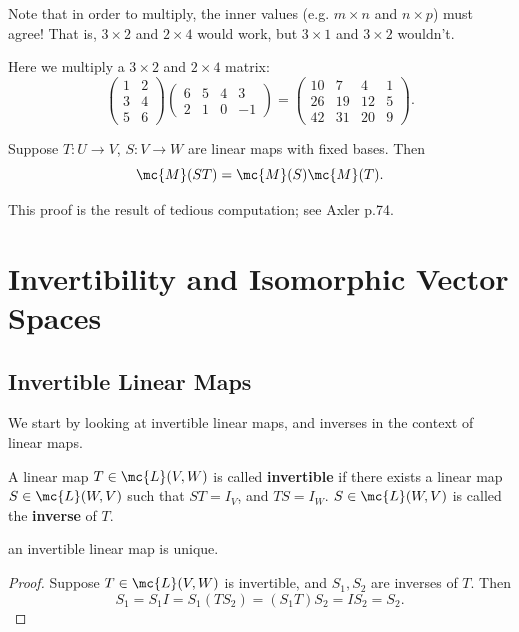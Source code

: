 \documentclass[math0540-lecture-notes.tex]{subfiles}
\begin{document}
Note that in order to multiply, the inner values (e.g. $m\times n$ and $n\times p$) must agree! That
is, $3\times 2$ and $2\times 4$ would work, but $3\times 1$ and $3\times 2$ wouldn't.
\begin{example}
  Here we multiply a $3\times 2$ and $2\times 4$ matrix: \[
    \begin{pmatrix} 1&2\\3&4\\5&6 \end{pmatrix} \begin{pmatrix} 6&5&4&3 \\2&1&0&-1\end{pmatrix}
    =\begin{pmatrix} 10&7&4&1\\26&19&12&5\\42&31&20&9 \end{pmatrix}
  .\] 
\end{example} 

\begin{proposition}[]{}
  Suppose $T:U\to V$, $S:V\to W$ are linear maps with fixed bases. Then \[
    \mc{M}(ST)=\mc{M}(S)\mc{M}(T)
  .\] 
\end{proposition}
This proof is the result of tedious computation; see Axler p.74.


\section{Invertibility and Isomorphic Vector Spaces}

\subsection{Invertible Linear Maps}

We start by looking at invertible linear maps, and inverses in the context of linear maps.

\begin{definition}{}
  A linear map $T\in \mc{L}(V,W)$ is called \textbf{invertible} if there exists a linear map $S\in
  \mc{L}(W,V)$ such that $ST=I_V$, and $TS=I_W$. $S\in \mc{L}(W,V)$ is called the \textbf{inverse}
  of $T$.
\end{definition}

\begin{proposition}{}
  an invertible linear map is unique.
\end{proposition}
\begin{proof}[Proof]
  Suppose $T\in \mc{L}(V,W)$ is invertible, and $S_1,S_2$ are inverses of $T$. Then \[
    S_1=S_1I=S_1(TS_2)=(S_1T)S_2=IS_2=S_2
  .\] 
\end{proof}
\end{document}
